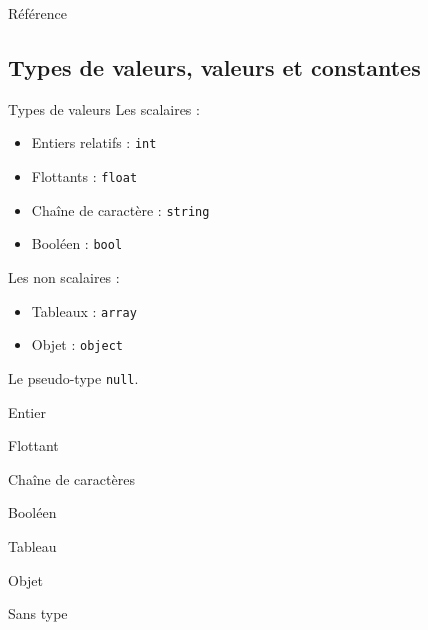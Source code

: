 \documentclass{beamer}
\begin{document}
\begin{frame}{Référence}

\end{frame}

\subsection{Types de valeurs, valeurs et constantes}

\begin{frame}{Types de valeurs}
Les scalaires :
\begin{itemize}
\item Entiers relatifs : \texttt{int}
\item Flottants : \texttt{float}
\item Chaîne de caractère : \texttt{string}
\item Booléen : \texttt{bool}
\end{itemize}
Les non scalaires :
\begin{itemize}
\item Tableaux : \texttt{array}
\item Objet : \texttt{object}
\end{itemize}
Le pseudo-type \texttt{null}.
\end{frame}

\begin{frame}{Entier}

\end{frame}

\begin{frame}{Flottant}

\end{frame}

\begin{frame}{Chaîne de caractères}

\end{frame}

\begin{frame}{Booléen}

\end{frame}

\begin{frame}{Tableau}

\end{frame}

\begin{frame}{Objet}

\end{frame}

\begin{frame}{Sans type}

\end{frame}
\end{document}
